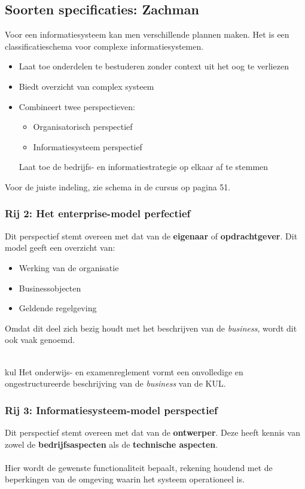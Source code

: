 \documentclass[../../main.tex]{subfiles}
\begin{document}
\subsection{Soorten specificaties: Zachman}
Voor een informatiesysteem kan men verschillende plannen maken. Het  is een classificatieschema voor complexe informatiesystemen.
\begin{itemize}
	\item Laat toe onderdelen te bestuderen zonder context uit het oog te verliezen
	\item Biedt overzicht van complex systeem
	\item Combineert twee perspectieven:
	\begin{itemize}
		\item Organisatorisch perspectief
		\item Informatiesysteem perspectief
	\end{itemize}
	Laat toe de bedrijfs- en informatiestrategie op elkaar af te stemmen
\end{itemize}
Voor de juiste indeling, zie schema in de cursus op pagina 51.\\
\subsubsection{Rij 2: Het enterprise-model perfectief}
Dit perspectief stemt overeen met dat van de \textbf{eigenaar} of \textbf{opdrachtgever}. Dit model geeft een overzicht van:
\begin{itemize}
	\item Werking van de organisatie
	\item Businessobjecten
	\item Geldende regelgeving
\end{itemize}
Omdat dit deel zich bezig houdt met het beschrijven van de \textit{business}, wordt dit ook vaak  genoemd.\\
\\
\begin{ex}{kul}
Het onderwijs- en examenreglement vormt een onvolledige en ongestructureerde beschrijving van de \textit{business} van de KUL.
\end{ex}
\subsubsection{Rij 3: Informatiesysteem-model perspectief}
Dit perspectief stemt overeen met dat van de \textbf{ontwerper}. Deze heeft kennis van zowel de \textbf{bedrijfsaspecten} als de \textbf{technische aspecten}. \\
\\
Hier wordt de gewenste functionaliteit bepaalt, rekening houdend met de beperkingen van de omgeving waarin het systeem operationeel is.
\end{document}

